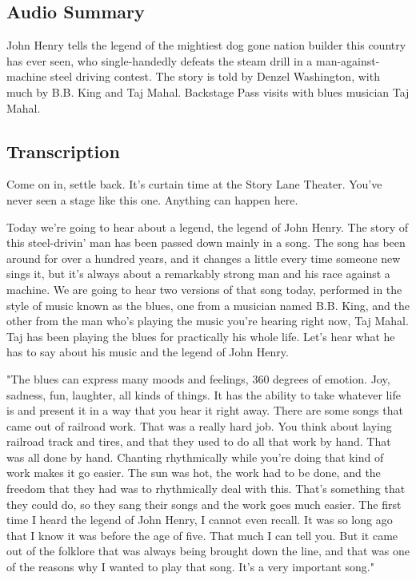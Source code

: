 \subsection{Audio Summary}

John Henry tells the legend of the mightiest dog gone nation builder this country has ever seen, who single-handedly defeats the steam drill in a man-against-machine steel driving contest. The story is told by Denzel Washington, with much by B.B. King and Taj Mahal. Backstage Pass visits with blues musician Taj Mahal.

\subsection{Transcription}

Come on in, settle back. It's curtain time at the Story Lane Theater. You've never seen a stage like this one. Anything can happen here.

Today we're going to hear about a legend, the legend of John Henry. The story of this steel-drivin' man has been passed down mainly in a song. The song has been around for over a hundred years, and it changes a little every time someone new sings it, but it's always about a remarkably strong man and his race against a machine. We are going to hear two versions of that song today, performed in the style of music known as the blues, one from a musician named B.B. King, and the other from the man who's playing the music you're hearing right now, Taj Mahal. Taj has been playing the blues for practically his whole life. Let's hear what he has to say about his music and the legend of John Henry.

"The blues can express many moods and feelings, 360 degrees of emotion. Joy, sadness, fun, laughter, all kinds of things. It has the ability to take whatever life is and present it in a way that you hear it right away. There are some songs that came out of railroad work. That was a really hard job. You think about laying railroad track and tires, and that they used to do all that work by hand. That was all done by hand. Chanting rhythmically while you're doing that kind of work makes it go easier. The sun was hot, the work had to be done, and the freedom that they had was to rhythmically deal with this. That's something that they could do, so they sang their songs and the work goes much easier. The first time I heard the legend of John Henry, I cannot even recall. It was so long ago that I know it was before the age of five. That much I can tell you. But it came out of the folklore that was always being brought down the line, and that was one of the reasons why I wanted to play that song. It's a very important song."

